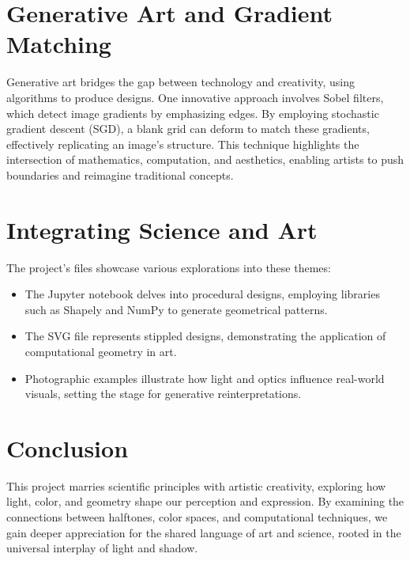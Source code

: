 \documentclass{article}
\begin{document}
\section*{Generative Art and Gradient Matching}
Generative art bridges the gap between technology and creativity, using algorithms to produce designs. One innovative approach involves Sobel filters, which detect image gradients by emphasizing edges. By employing stochastic gradient descent (SGD), a blank grid can deform to match these gradients, effectively replicating an image's structure. This technique highlights the intersection of mathematics, computation, and aesthetics, enabling artists to push boundaries and reimagine traditional concepts.

\section*{Integrating Science and Art}
The project's files showcase various explorations into these themes:

\begin{itemize}
    \item The Jupyter notebook delves into procedural designs, employing libraries such as Shapely and NumPy to generate geometrical patterns.
    \item The SVG file represents stippled designs, demonstrating the application of computational geometry in art.
    \item Photographic examples illustrate how light and optics influence real-world visuals, setting the stage for generative reinterpretations.
\end{itemize}

\section*{Conclusion}
This project marries scientific principles with artistic creativity, exploring how light, color, and geometry shape our perception and expression. By examining the connections between halftones, color spaces, and computational techniques, we gain deeper appreciation for the shared language of art and science, rooted in the universal interplay of light and shadow.
\end{document}
